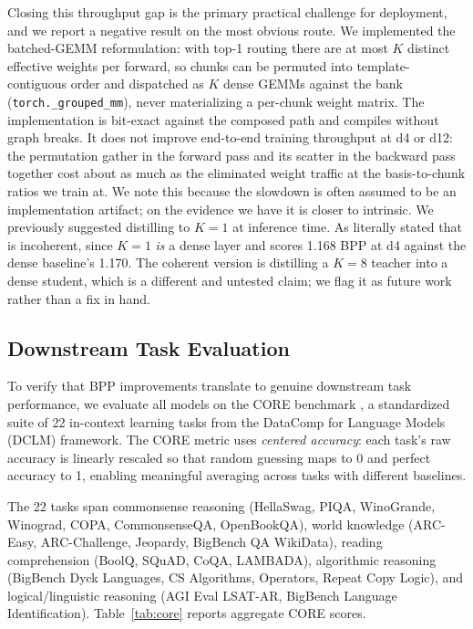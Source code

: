 \documentclass{article}
\begin{document}
Closing this throughput gap is the primary practical challenge for deployment, and we report a negative result on the most obvious route. We implemented the batched-GEMM reformulation: with top-1 routing there are at most $K$ distinct effective weights per forward, so chunks can be permuted into template-contiguous order and dispatched as $K$ dense GEMMs against the bank (\texttt{torch.\_grouped\_mm}), never materializing a per-chunk weight matrix. The implementation is bit-exact against the composed path and compiles without graph breaks. It does not improve end-to-end training throughput at d4 or d12: the permutation gather in the forward pass and its scatter in the backward pass together cost about as much as the eliminated weight traffic at the basis-to-chunk ratios we train at. We note this because the slowdown is often assumed to be an implementation artifact; on the evidence we have it is closer to intrinsic. We previously suggested distilling to $K{=}1$ at inference time. As literally stated that is incoherent, since $K{=}1$ \emph{is} a dense layer and scores 1.168 BPP at d4 against the dense baseline's 1.170. The coherent version is distilling a $K{=}8$ teacher into a dense student, which is a different and untested claim; we flag it as future work rather than a fix in hand.

\subsection{Downstream Task Evaluation}
\label{sec:core}

To verify that BPP improvements translate to genuine downstream task performance, we evaluate all models on the CORE benchmark \citep{li2024dclm}, a standardized suite of 22 in-context learning tasks from the DataComp for Language Models (DCLM) framework. The CORE metric uses \emph{centered accuracy}: each task's raw accuracy is linearly rescaled so that random guessing maps to 0 and perfect accuracy to 1, enabling meaningful averaging across tasks with different baselines.

The 22 tasks span commonsense reasoning (HellaSwag, PIQA, WinoGrande, Winograd, COPA, CommonsenseQA, OpenBookQA), world knowledge (ARC-Easy, ARC-Challenge, Jeopardy, BigBench QA WikiData), reading comprehension (BoolQ, SQuAD, CoQA, LAMBADA), algorithmic reasoning (BigBench Dyck Languages, CS Algorithms, Operators, Repeat Copy Logic), and logical/linguistic reasoning (AGI Eval LSAT-AR, BigBench Language Identification). Table~\ref{tab:core} reports aggregate CORE scores.
\end{document}
